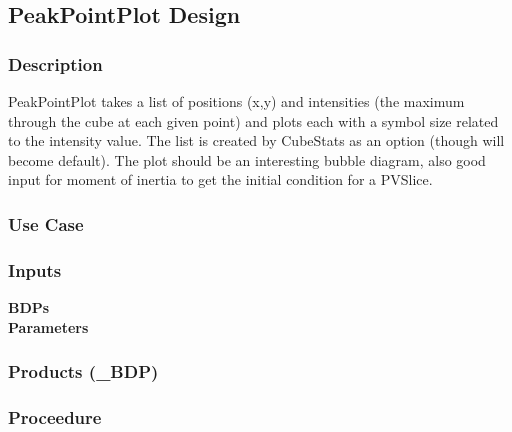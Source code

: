 \subsection{PeakPointPlot Design}

\subsubsection{Description}
PeakPointPlot takes a list of positions (x,y) and intensities (the maximum
through the cube at each given point) and plots each with a symbol size
related to the intensity value. The list is created by CubeStats as an option
(though will become default). The plot should be an interesting bubble diagram,
also good input for moment of inertia to get the initial condition for
a PVSlice.

\subsubsection{Use Case}


\subsubsection{Inputs}
{\bf BDPs}\\

{\bf Parameters}\\
\begin{description}
\item[]
\end{description}

\subsubsection{Products (\_BDP)}


\subsubsection{Proceedure}
\clearpage
